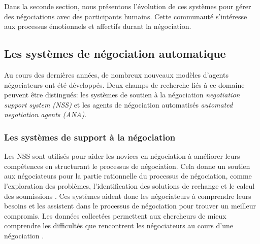 		Dans la seconde section, nous présentons l'évolution de ces systèmes pour gérer des négociations avec des participants humains. Cette communauté s'intéresse aux processus émotionnels et affectifs durant la négociation. 
	
		\subsection{Les systèmes de négociation automatique}	
		Au cours des dernières années, de nombreux nouveaux modèles d'agents négociateurs ont été développés. Deux champs de recherche liés à ce domaine peuvent être distingués: les systèmes de soutien à la négociation \emph{ negotiation support system (NSS)} et les agents de négociation automatisés \emph{automated negotiation agents (ANA)}.
	
		\subsubsection{Les systèmes de support à la négociation}
		\label{sec:1nss}
		
			 Les NSS sont utilisés pour aider les novices en négociation à améliorer leurs compétences en structurant le processus de négociation. Cela donne un soutien aux négociateurs pour la partie rationnelle du processus de négociation, comme l'exploration des problèmes, l'identification des solutions de rechange et le calcul des soumissions \cite{hindriks2008creating}. Ces systèmes aident donc les négociateurs à comprendre leurs besoins et les assistent dans le processus de négociation pour trouver un meilleur compromis. Les données collectées permettent aux chercheurs de mieux comprendre les difficultés que rencontrent les négociateurs au cours d'une négociation \cite{jonker2012negotiating}. 
			 
